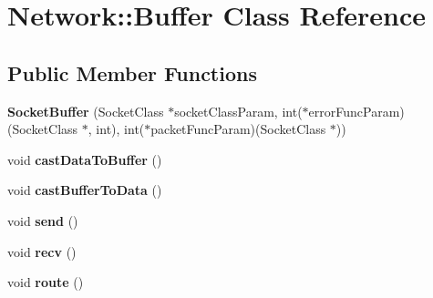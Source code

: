 \hypertarget{classNetwork_1_1Buffer}{
\section{Network::Buffer Class Reference}
\label{classNetwork_1_1Buffer}
}
\subsection*{Public Member Functions}
\begin{DoxyCompactItemize}
\item 
\hypertarget{classNetwork_1_1Buffer_a2059a0c73d4cef2158df68a991e1b79a}{
{\bfseries SocketBuffer} (SocketClass $\ast$socketClassParam, int($\ast$errorFuncParam)(SocketClass $\ast$, int), int($\ast$packetFuncParam)(SocketClass $\ast$))}
\label{classNetwork_1_1Buffer_a2059a0c73d4cef2158df68a991e1b79a}

\item 
\hypertarget{classNetwork_1_1Buffer_afa008ffcb28fe2b32bd8e8fbe8a71f73}{
void {\bfseries castDataToBuffer} ()}
\label{classNetwork_1_1Buffer_afa008ffcb28fe2b32bd8e8fbe8a71f73}

\item 
\hypertarget{classNetwork_1_1Buffer_a39eebfa132132ec128efeaaa4115f791}{
void {\bfseries castBufferToData} ()}
\label{classNetwork_1_1Buffer_a39eebfa132132ec128efeaaa4115f791}

\item 
\hypertarget{classNetwork_1_1Buffer_aad30167fe6de88054d130ed68107042f}{
void {\bfseries send} ()}
\label{classNetwork_1_1Buffer_aad30167fe6de88054d130ed68107042f}

\item 
\hypertarget{classNetwork_1_1Buffer_a9bb49b3a973ed122a0a76038d742311c}{
void {\bfseries recv} ()}
\label{classNetwork_1_1Buffer_a9bb49b3a973ed122a0a76038d742311c}

\item 
\hypertarget{classNetwork_1_1Buffer_a407e37cea75f7b627c8a28f979b6bf68}{
void {\bfseries route} ()}
\label{classNetwork_1_1Buffer_a407e37cea75f7b627c8a28f979b6bf68}

\end{DoxyCompactItemize}
